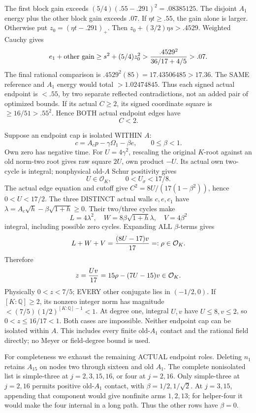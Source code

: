 \documentclass[11pt]{article}
\begin{document}
The first block gain exceeds
\((5/4)(.55-.291)^2=.08385125\).
The disjoint \(A_1\) energy plus the other
block gain exceeds \(.07\).
If \(\eta t\ge.55\), the gain alone is
larger.
Otherwise put \(z_0=(\eta t-.291)_+\).
Then \(z_0+(3/2)\eta s>.4529\).
Weighted Cauchy gives
\[
 e_1+\text{other gain}\ge s^2+(5/4)z_0^2
       >{.4529^2\over36/17+4/5}>.07 .
\]
The final rational comparison is
\(.4529^2(85)=17.43506485>17.36\).
The SAME reference and \(A_1\) energy
would total \(>1.02474845\).
Thus each signed actual endpoint is
\(<.55\), by two separate reflected
contradictions, not an added pair of
optimized bounds.
If its actual \(C\ge2\), its signed
coordinate square is \(\ge16/51>.55^2\).
Hence BOTH actual endpoint edges have
\[
                                      C<2 .
\tag{A16r1C}\label{eq:arithA16rankonecutoff}
\]

Suppose an endpoint cap is isolated
WITHIN \(A\):
\[
 c=A_cp-\gamma\Omega_1-\beta e,\qquad0\le\beta<1 .
\]
Own zero has negative time.
For \(U=4\gamma^2\), rescaling the
original \(K\)-root against an old
norm-two root gives raw square \(2U\),
own product \(-U\).
Its actual own two-cycle is integral;
nonphysical old-\(A\) Schur positivity gives
\[
               U\in\mathcal O_K,\qquad0<U_\sigma<17/8 .
\]
The actual edge equation and cutoff give
\(C^2=8U/(17(1-\beta^2))\), hence \(0<U<17/2\).
The three DISTINCT actual walls \(c,e,c_1\)
have \(\lambda=A_c\sqrt h-\beta\sqrt{1+h}\ge0\).
Their two/three cycles make
\[
             L=4\lambda^2,\quad
             W=8\beta\sqrt{1+h}\lambda,\quad
             V=4\beta^2
\]
integral, including possible zero cycles.
Expanding ALL \(\beta\)-terms gives
\[
                  L+W+V={(8U-17)v\over17}=:\rho\in\mathcal O_K .
\]
Therefore
\[
                    z={Uv\over17}=15\rho-(7U-15)v
                                              \in\mathcal O_K .
\]
Physically \(0<z<7/5\); EVERY other
conjugate lies in \((-1/2,0)\).
If \([K:\mathbb Q]\ge2\), its nonzero
integer norm has magnitude
\(<(7/5)(1/2)^{[K:\mathbb Q]-1}<1\).
At degree one, integral \(U,v\) have
\(U\le8,v\le2\), so \(0<z\le16/17<1\).
Both cases are impossible.
Neither endpoint cap can be isolated
within \(A\).
This includes every finite old-\(A_1\)
contact and the rational field directly;
no Meyer or field-degree bound is used.

For completeness we exhaust the remaining
ACTUAL endpoint roles.
Deleting \(n_1\) retains \(A_{15}\)
on nodes two through sixteen and old
\(A_1\).
The complete nonisolated list is
simple-three at \(j=2,3,15,16\), or
four at \(j=2,16\).
Only simple-three at \(j=2,16\)
permits positive old-\(A_1\) contact,
with \(\beta=1/2,1/\sqrt2\).
At \(j=3,15\), appending that component
would give nonfinite arms \(1,2,13\);
for helper-four it would make the
four internal in a long path.
Thus the other rows have \(\beta=0\).
\end{document}
